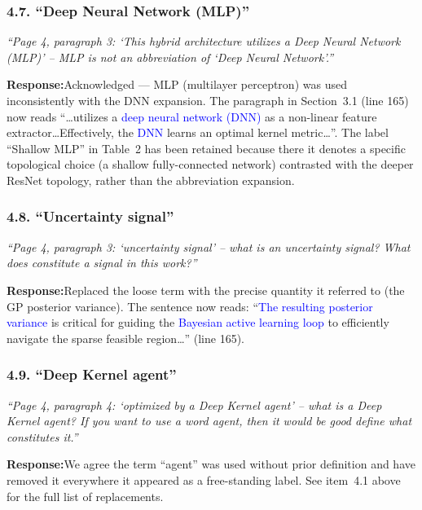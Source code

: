 \documentclass[11pt,a4paper]{article}
\newcommand{\new}[1]{\textcolor{blue}{#1}}
\newcommand{\rev}[1]{\par\noindent\textit{\small #1}\par\smallskip}
\newcommand{\resp}{\par\noindent\textbf{Response:}\space}
\begin{document}
\subsubsection*{4.7. ``Deep Neural Network (MLP)''}
\rev{``Page 4, paragraph 3: `This hybrid architecture utilizes a Deep Neural Network (MLP)' -- MLP is not an abbreviation of `Deep Neural Network'.''}
\resp Acknowledged --- MLP (multilayer perceptron) was used inconsistently with the DNN expansion. The paragraph in Section~3.1 (line 165) now reads ``\ldots utilizes a \new{deep neural network (DNN)} as a non-linear feature extractor\ldots Effectively, the \new{DNN} learns an optimal kernel metric\ldots''. The label ``Shallow MLP'' in Table~2 has been retained because there it denotes a specific topological choice (a shallow fully-connected network) contrasted with the deeper ResNet topology, rather than the abbreviation expansion.

\subsubsection*{4.8. ``Uncertainty signal''}
\rev{``Page 4, paragraph 3: `uncertainty signal' -- what is an uncertainty signal? What does constitute a signal in this work?''}
\resp Replaced the loose term with the precise quantity it referred to (the GP posterior variance). The sentence now reads: ``\new{The resulting posterior variance} is critical for guiding the \new{Bayesian active learning loop} to efficiently navigate the sparse feasible region\ldots'' (line 165).

\subsubsection*{4.9. ``Deep Kernel agent''}
\rev{``Page 4, paragraph 4: `optimized by a Deep Kernel agent' -- what is a Deep Kernel agent? If you want to use a word agent, then it would be good define what constitutes it.''}
\resp We agree the term ``agent'' was used without prior definition and have removed it everywhere it appeared as a free-standing label. See item~4.1 above for the full list of replacements.
\end{document}
